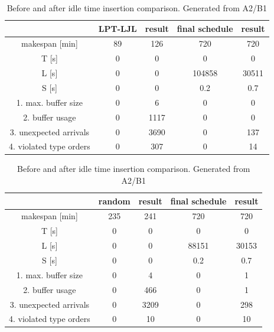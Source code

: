 \documentclass{ctuthesis}
\begin{document}
\begin{table}[H]
\begin{tabular}{ |c|| c | c | c | c |} 
\hline
 & LPT-LJL & result & final schedule & result \\ 
\hline
makespan [min] & 89 & 126 & 720 & 720 \\
\hline
T [s]& 0 & 0 & 0 & 0 \\
\hline
L [s]& 0 & 0 & 104858 & 30511 \\
\hline
S [s]& 0 & 0 & 0.2 & 0.7 \\
\hline
1. max. buffer size & 0 & 6 & 0 & 0\\ 
\hline
2. buffer usage  & 0 & 1117 & 0 & 0\\ 
\hline
3. unexpected arrivals & 0 & 3690 & 0 & 137\\ 
\hline
4. violated type orders & 0 & 307 & 0 & 14\\ 
\hline
\end{tabular}
\caption{Before and after idle time insertion comparison. Generated from A2/B1}
\end{table}

\begin{table}[H]
\begin{tabular}{ |c|| c | c | c | c |} 
\hline
 & random & result & final schedule & result \\ 
\hline
makespan [min] & 235 & 241 & 720 & 720 \\
\hline
T [s]& 0 & 0 & 0 & 0 \\
\hline
L [s]& 0 & 0 & 88151 & 30153 \\
\hline
S [s]& 0 & 0 & 0.2 & 0.7 \\
\hline
1. max. buffer size & 0 & 4 & 0 & 1\\ 
\hline
2. buffer usage  & 0 & 466 & 0 & 1\\ 
\hline
3. unexpected arrivals & 0 & 3209 & 0 & 298\\ 
\hline
4. violated type orders & 0 & 10 & 0 & 10\\ 
\hline
\end{tabular}
\caption{Before and after idle time insertion comparison. Generated from A2/B1}
\end{table}
\end{document}
